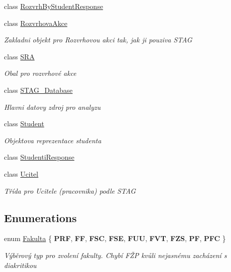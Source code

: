 \begin{DoxyCompactItemize}
\item 
class \hyperlink{class_analyza_rozvrhu_1_1_s_t_a_g___classes_1_1_rozvrh_by_student_response}{Rozvrh\+By\+Student\+Response}
\item 
class \hyperlink{class_analyza_rozvrhu_1_1_s_t_a_g___classes_1_1_rozvrhova_akce}{Rozvrhova\+Akce}
\begin{DoxyCompactList}\small\item\em Zakladni objekt pro Rozvrhovou akci tak, jak ji pouziva S\+T\+AG \end{DoxyCompactList}\item 
class \hyperlink{class_analyza_rozvrhu_1_1_s_t_a_g___classes_1_1_s_r_a}{S\+RA}
\begin{DoxyCompactList}\small\item\em Obal pro rozvrhové akce \end{DoxyCompactList}\item 
class \hyperlink{class_analyza_rozvrhu_1_1_s_t_a_g___classes_1_1_s_t_a_g___database}{S\+T\+A\+G\+\_\+\+Database}
\begin{DoxyCompactList}\small\item\em Hlavni datovy zdroj pro analyzu \end{DoxyCompactList}\item 
class \hyperlink{class_analyza_rozvrhu_1_1_s_t_a_g___classes_1_1_student}{Student}
\begin{DoxyCompactList}\small\item\em Objektova reprezentace studenta \end{DoxyCompactList}\item 
class \hyperlink{class_analyza_rozvrhu_1_1_s_t_a_g___classes_1_1_studenti_response}{Studenti\+Response}
\item 
class \hyperlink{class_analyza_rozvrhu_1_1_s_t_a_g___classes_1_1_ucitel}{Ucitel}
\begin{DoxyCompactList}\small\item\em Třída pro Ucitele (pracovnika) podle S\+T\+AG \end{DoxyCompactList}\end{DoxyCompactItemize}
\subsection*{Enumerations}
\begin{DoxyCompactItemize}
\item 
enum \hyperlink{namespace_analyza_rozvrhu_1_1_s_t_a_g___classes_a2e3181499083134e3da66098b571fb83}{Fakulta} \{ \newline
{\bfseries P\+RF}, 
{\bfseries FF}, 
{\bfseries F\+SC}, 
{\bfseries F\+SE}, 
\newline
{\bfseries F\+UU}, 
{\bfseries F\+VT}, 
{\bfseries F\+ZS}, 
{\bfseries PF}, 
\newline
{\bfseries P\+FC}
 \}\begin{DoxyCompactList}\small\item\em Výběrový typ pro zvolení fakulty. Chybí FŽP kvůli nejasnému zacházení s diakritikou \end{DoxyCompactList}
\end{DoxyCompactItemize}


